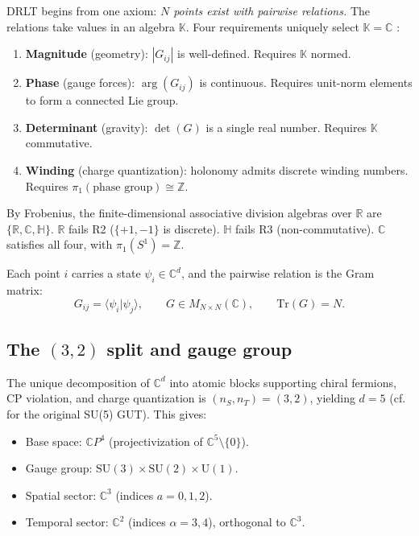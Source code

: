 \documentclass[12pt]{article}
\theoremstyle{remark}
\begin{document}
DRLT begins from one axiom: \emph{$N$ points exist with pairwise
relations.} The relations take values in an algebra $\mathbb{K}$.
Four requirements uniquely select $\mathbb{K} = \mathbb{C}$
\cite{Frobenius}:

\begin{enumerate}
\item[\textbf{R1.}] \textbf{Magnitude} (geometry): $|G_{ij}|$ is
  well-defined. Requires $\mathbb{K}$ normed.
\item[\textbf{R2.}] \textbf{Phase} (gauge forces): $\arg(G_{ij})$ is
  continuous. Requires unit-norm elements to form a connected Lie group.
\item[\textbf{R3.}] \textbf{Determinant} (gravity): $\det(G)$ is a
  single real number. Requires $\mathbb{K}$ commutative.
\item[\textbf{R4.}] \textbf{Winding} (charge quantization): holonomy
  admits discrete winding numbers. Requires
  $\pi_1(\text{phase group}) \cong \mathbb{Z}$.
\end{enumerate}

\noindent
By Frobenius, the finite-dimensional associative division algebras over
$\mathbb{R}$ are $\{\mathbb{R}, \mathbb{C}, \mathbb{H}\}$. $\mathbb{R}$
fails R2 ($\{+1,-1\}$ is discrete). $\mathbb{H}$ fails R3
(non-commutative). $\mathbb{C}$ satisfies all four, with
$\pi_1(S^1) = \mathbb{Z}$.

Each point $i$ carries a state $\psi_i \in \mathbb{C}^d$, and the
pairwise relation is the Gram matrix:
\begin{equation}
G_{ij} = \langle \psi_i | \psi_j \rangle, \qquad
G \in M_{N \times N}(\mathbb{C}), \qquad
\mathrm{Tr}(G) = N.
\end{equation}

\subsection{The $(3,2)$ split and gauge group}

The unique decomposition of $\mathbb{C}^d$ into atomic blocks supporting
chiral fermions, CP violation, and charge quantization is
$(n_S, n_T) = (3, 2)$, yielding $d = 5$ \cite{DRLT-rep}
(cf.\ \cite{Georgi-Glashow} for the original SU(5) GUT). This gives:

\begin{itemize}
\item Base space: $\mathbb{C}P^4$ (projectivization of
  $\mathbb{C}^5 \setminus \{0\}$).
\item Gauge group: $\mathrm{SU}(3) \times \mathrm{SU}(2) \times
  \mathrm{U}(1)$.
\item Spatial sector: $\mathbb{C}^3$ (indices $a = 0, 1, 2$).
\item Temporal sector: $\mathbb{C}^2$ (indices $\alpha = 3, 4$),
  orthogonal to $\mathbb{C}^3$.
\end{itemize}
\end{document}
